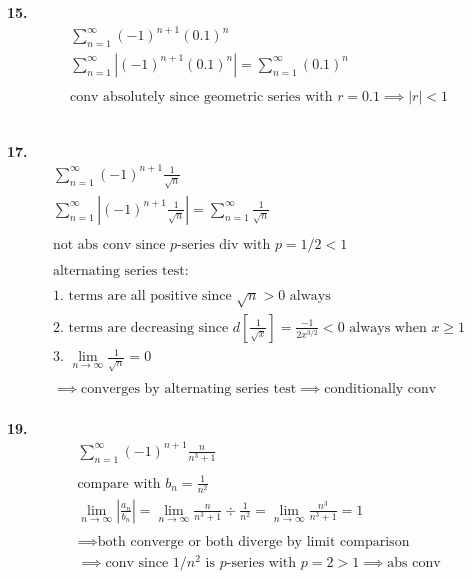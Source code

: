 \documentclass{article}
\begin{document}
\noindent
\textbf{15.}
\begin{gather*}
\sum_{n=1}^{\infty} (-1)^{n+1} (0.1)^n
\\
\sum_{n=1}^{\infty} \left| (-1)^{n+1} (0.1)^n \right|
= \sum_{n=1}^{\infty} (0.1)^n
\\
\\
\text{conv absolutely since geometric series with } r=0.1 \implies |r|<1
\end{gather*}
\hfill
\\



\newpage



\noindent
\textbf{17.}
\begin{gather*}
\sum_{n=1}^{\infty} (-1)^{n+1} \frac{1}{\sqrt{n}}
\\
\sum_{n=1}^{\infty} \left| (-1)^{n+1} \frac{1}{\sqrt{n}} \right|
=
\sum_{n=1}^{\infty} \frac{1}{\sqrt{n}}
\\
\\
\text{not abs conv since $p$-series div with } p=1/2<1
\\
\\
\text{alternating series test:}
\\
\\
\text{1. terms are all positive since } \sqrt{n}>0 \text{~always}
\\
\text{2. terms are decreasing since }
d \left[ \frac{1}{\sqrt{x}} \right] = \frac{-1}{2x^{3/2}} < 0 \text{~always when } x \geq 1
\\
\text{3. }
\lim_{n \to \infty} \frac{1}{\sqrt{n}} = 0
\\
\\
\implies \text{converges by alternating series test}
\implies \text{conditionally conv}
\end{gather*}
\hfill
\\




\noindent
\textbf{19.}
\begin{gather*}
\sum_{n=1}^{\infty} (-1)^{n+1} \frac{n}{n^3+1}
\\
\\
\text{compare with } b_n = \frac{1}{n^2}
\\
\lim_{n \to \infty} \left| \frac{a_n}{b_n} \right|
=\lim_{n \to \infty} \frac{n}{n^3+1} \div \frac{1}{n^2}
=\lim_{n \to \infty} \frac{n^3}{n^3+1}=1
\\
\\
\implies \text{both converge or both diverge by limit comparison}
\\
\implies \text{conv since $1/n^2$ is $p$-series with $p=2>1$}
\implies \text{abs conv}
\end{gather*}
\hfill
\\
\end{document}
